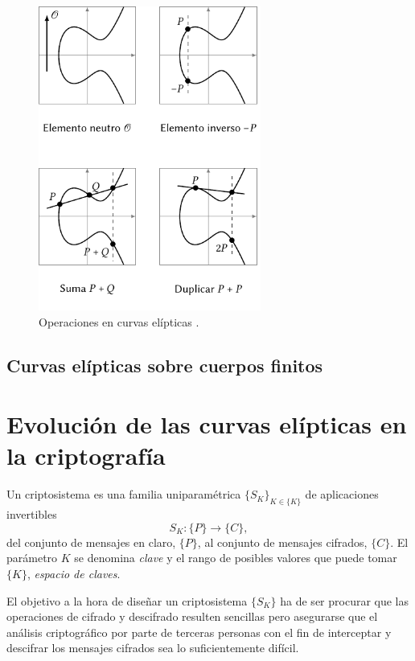 \documentclass[
  a4paper,
  12pt,
  spanish,
]{scrartcl}
\begin{document}
\begin{figure}[h]
  \centering
  \includegraphics[width=0.65\textwidth]{img/operaciones-curvas}
  \caption{Operaciones en curvas elípticas \parencite{eichlseder_elliptic_2016}.}
  \label{fig:operaciones-curvas}
\end{figure}


\subsection{Curvas elípticas sobre cuerpos finitos}




\section{Evolución de las curvas elípticas en la criptografía}

Un criptosistema es una familia uniparamétrica \(\{S_K\}_{K \in \{K\}}\) de aplicaciones invertibles \[S_K: \{P\} \to \{C\},\] del conjunto de mensajes en claro, \(\{P\}\), al conjunto de mensajes cifrados, \(\{C\}\). 
El parámetro \(K\) se denomina \textit{clave} y el rango de posibles valores que puede tomar \(\{K\}\), \textit{espacio de claves}.

El objetivo a la hora de diseñar un criptosistema \(\{S_K\}\) ha de ser procurar que las operaciones de cifrado y descifrado resulten sencillas pero asegurarse que el análisis criptográfico por parte de terceras personas con el fin de interceptar y descifrar los mensajes cifrados sea lo suficientemente difícil.
\end{document}

